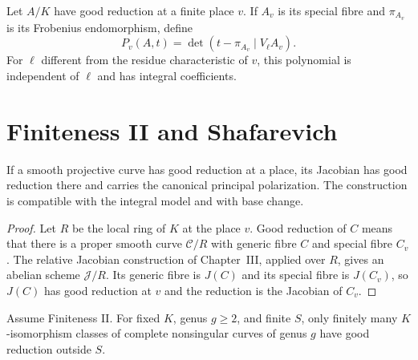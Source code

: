 \begin{definition}
\label{def:milne-frobenius-polynomial}

Let $A/K$ have good reduction at a finite place $v$.  If $A_v$ is its special
fibre and $\pi_{A_v}$ is its Frobenius endomorphism, define
\[
P_v(A,t)=\det(t-\pi_{A_v}\mid V_\ell A_v).
\]
For $\ell$ different from the residue characteristic of $v$, this polynomial
is independent of $\ell$ and has integral coefficients.
\end{definition}

\section{Finiteness II and Shafarevich}

\begin{proposition}
\label{prop:milne-jacobian-good-reduction}

If a smooth projective curve has good reduction at a place, its Jacobian has
good reduction there and carries the canonical principal polarization.  The
construction is compatible with the integral model and with base change.
\end{proposition}

\begin{proof}

Let $R$ be the local ring of $K$ at the place $v$.  Good reduction of $C$
means that there is a proper smooth curve $\mathcal C/R$ with generic fibre
$C$ and special fibre $C_v$.  The relative Jacobian construction of
Chapter~III, applied over $R$, gives an abelian scheme $\mathcal J/R$.
Its generic fibre is $J(C)$ and its special fibre is $J(C_v)$, so $J(C)$ has
good reduction at $v$ and the reduction is the Jacobian of $C_v$.

\end{proof}


\begin{theorem}
\label{thm:milne-shafarevich-curves}

Assume Finiteness II.  For fixed $K$, genus $g\ge2$, and finite $S$, only
finitely many $K$-isomorphism classes of complete nonsingular curves of genus
$g$ have good reduction outside $S$.
\end{theorem}

